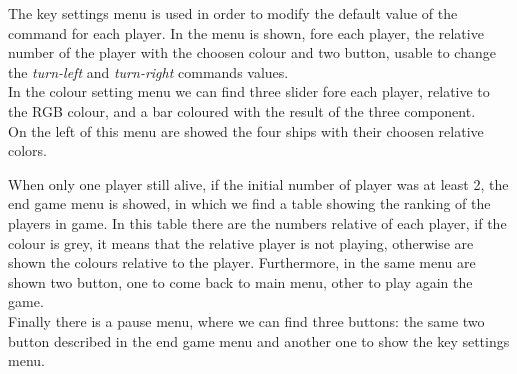 \documentclass[11pt]{article}
\begin{document}
	The key settings menu is used in order to modify the default value of the command for each player. In the menu is shown, fore each player, the relative number of the player with the choosen colour and two button, usable to change the \textit{turn-left} and \textit{turn-right} commands values.\\
	
	In the colour setting menu we can find three slider fore each player, relative to the RGB colour, and a bar coloured with the result of the three component.\\
	On the left of this menu are showed the four ships with their choosen relative colors.
	
	When only one player still alive, if the initial number of player was at least 2, the end game menu is showed, in which we find a table showing the ranking of the players in game. In this table there are the numbers relative of each player, if the colour is grey, it means that the relative player is not playing, otherwise are shown the colours relative to the player.
	Furthermore, in the same menu are shown two button, one to come back to main menu, other to play again the game.\\
	
	Finally there is a pause menu, where we can find three buttons: the same two button described in the end game menu and another one to show the key settings menu.\\
	 
\end{document}
